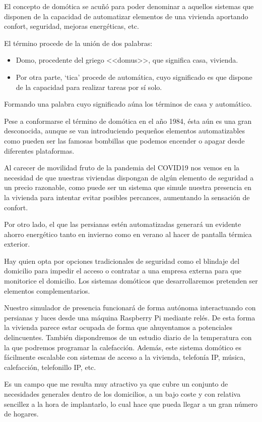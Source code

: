 
El concepto de domótica se acuñó para poder denominar a aquellos sistemas que disponen de la capacidad de automatizar elementos de una vivienda aportando confort, seguridad, mejoras energéticas, etc.

El término procede de la unión de dos palabras:

\begin{itemize}
    \item Domo, procedente del griego <<domus>>, que significa casa, vivienda.
    \item Por otra parte, ‘tica’ procede de automática, cuyo significado es que dispone de la capacidad para realizar tareas por sí solo.
\end{itemize}

Formando una palabra cuyo significado aúna los términos de casa y automático.

Pese a conformarse el término de domótica en el año 1984, ésta aún es una gran desconocida, aunque se van introduciendo pequeños elementos automatizables como pueden ser las famosas bombillas que podemos encender o apagar desde diferentes plataformas.

Al carecer de movilidad fruto de la pandemia del COVID19 nos vemos en la necesidad de que nuestras viviendas dispongan de algún elemento de seguridad a un precio razonable, como puede ser un sistema que simule nuestra presencia en la vivienda para intentar evitar posibles percances, aumentando la sensación de confort.

Por otro lado, el que las persianas estén automatizadas generará un evidente ahorro energético tanto en invierno como en verano al hacer de pantalla térmica exterior.

Hay quien opta por opciones tradicionales de seguridad como el blindaje del domicilio para impedir el acceso o contratar a una empresa externa para que monitorice el domicilio. Los sistemas domóticos que desarrollaremos pretenden ser elementos complementarios.

Nuestro simulador de presencia funcionará de forma autónoma interactuando con persianas y luces desde una máquina Raspberry Pi mediante relés. De esta forma la vivienda parece estar ocupada de forma que ahuyentamos a potenciales delincuentes. También dispondremos de un estudio diario de la temperatura con la que podremos programar la calefacción. Además, este sistema domótico es fácilmente escalable con sistemas de acceso a la vivienda, telefonía IP, música, calefacción, telefonillo IP, etc.

Es un campo que me resulta muy atractivo ya que cubre un conjunto de necesidades generales dentro de los domicilios, a un bajo coste y con relativa sencillez a la hora de implantarlo, lo cual hace que pueda llegar a un gran número de hogares.
